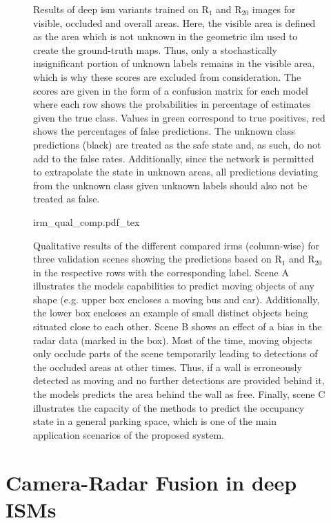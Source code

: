 \begin{figure}[H]
	\caption{\label{tab:deep_ism_r20_results}Results of deep \gls{ism} variants trained on R$_1$ and R$_{20}$ images for visible, occluded and overall areas. Here, the visible area is defined as the area which is not unknown in the geometric \gls{ilm} used to create the ground-truth maps. Thus, only a stochastically insignificant portion of unknown labels remains in the visible area, which is why these scores are excluded from consideration. The scores are given in the form of a confusion matrix for each model where each row shows the probabilities in percentage of estimates given the true class. Values in green correspond to true positives, red shows the percentages of false predictions. The unknown class predictions (black) are treated as the safe state and, as such, do not add to the false rates. Additionally, since the network is permitted to extrapolate the state in unknown areas, all predictions deviating from the unknown class given unknown labels should also not be treated as false.}
\end{figure} 
\begin{figure}[H]
	\begin{center}
		{irm_qual_comp.pdf_tex}
		\caption{\label{fig:irm_qual_comp}Qualitative results of the different compared \gls{irm}s (column-wise) for three validation scenes showing the predictions based on R$_1$ and R$_{20}$ in the respective rows with the corresponding label. Scene A illustrates the models capabilities to predict moving objects of any shape (e.g. upper box encloses a moving bus and car). Additionally, the lower box encloses an example of small distinct objects being situated close to each other. Scene B shows an effect of a bias in the radar data (marked in the box). Most of the time, moving objects only occlude parts of the scene temporarily leading to detections of the occluded areas at other times. Thus, if a wall is erroneously detected as moving and no further detections are provided behind it, the models predicts the area behind the wall as free. Finally, scene C illustrates the capacity of the methods to predict the occupancy state in a general parking space, which is one of the main application scenarios of the proposed system.}
	\end{center}
\end{figure}
%
\section{Camera-Radar Fusion in deep ISMs}
\label{sec:cam_radar_fusion_in_deep_isms}
%

